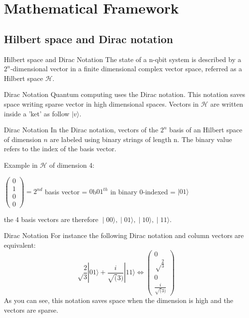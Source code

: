 \documentclass[svgnames,smaller]{beamer}
\begin{document}
\section{Mathematical Framework}

\subsection{Hilbert space and Dirac notation}

\begin{frame}[fragile]{Hilbert space and Dirac Notation}
  The state of a n-qbit system is described by a $2^n$-dimensional vector in a finite dimensional complex vector space,
  referred as a Hilbert space $\mathcal{H}$.
  
  \begin{block}{Dirac Notation}
    Quantum computing uses the Dirac notation. This notation saves space writing sparse vector in high dimensional
    spaces. Vectors in $\mathcal{H}$ are written inside a 'ket' as follow $|v\rangle$.
  \end{block}
\end{frame}

\begin{frame}[fragile]{Dirac Notation}
 In the Dirac notation, vectors of the $2^n$ basis of an Hilbert space of dimension $n$ are labeled using binary strings of
 length n. The binary value refers to the index of the basis vector.

 Example in $\mathcal{H}$ of dimension 4:
 \begin{center}
   $\begin{pmatrix} 0 \\ 1 \\ 0 \\ 0 \end{pmatrix} = 2^{nd}$  basis vector = $0$b$01^{th}$ in binary 0-indexed =
   $|01\rangle$
 \end{center}
 
   the 4 basis vectors are therefore $∣00⟩, ∣01⟩, ∣10⟩, ∣11⟩$.
\end{frame}

\begin{frame}[fragile]{Dirac Notation}
  For instance the following Dirac notation and column vectors are equivalent:
$$\sqrt\frac{2}{3}|01\rangle + \frac{i}{\sqrt(3)}|11\rangle \Longleftrightarrow \begin{pmatrix}0 \\ \sqrt\frac{2}{3}
    \\ 0 \\ \frac{i}{\sqrt(3)} \end{pmatrix}$$
  As you can see, this notation saves space when the dimension is high and the vectors are sparse.
\end{frame}
\end{document}
